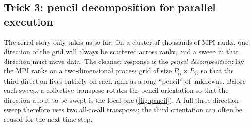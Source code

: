 \documentclass[11pt]{article}
\begin{document}
\subsection{Trick 3: pencil decomposition for parallel execution}
\label{sec:pencil}

The serial story only takes us so far.  On a cluster of thousands
of MPI ranks, one direction of the grid will always be scattered
across ranks, and a sweep in that direction must move data.  The
cleanest response is the \emph{pencil decomposition}: lay the MPI
ranks on a two-dimensional process grid of size $P_\alpha \times
P_\beta$, so that the third direction lives entirely on each rank as
a long ``pencil'' of unknowns.  Before each sweep, a collective
transpose rotates the pencil orientation so that the direction about
to be swept is the local one (\cref{fig:pencil}).  A full
three-direction sweep therefore uses two all-to-all transposes; the
third orientation can often be reused for the next time step.
\end{document}

